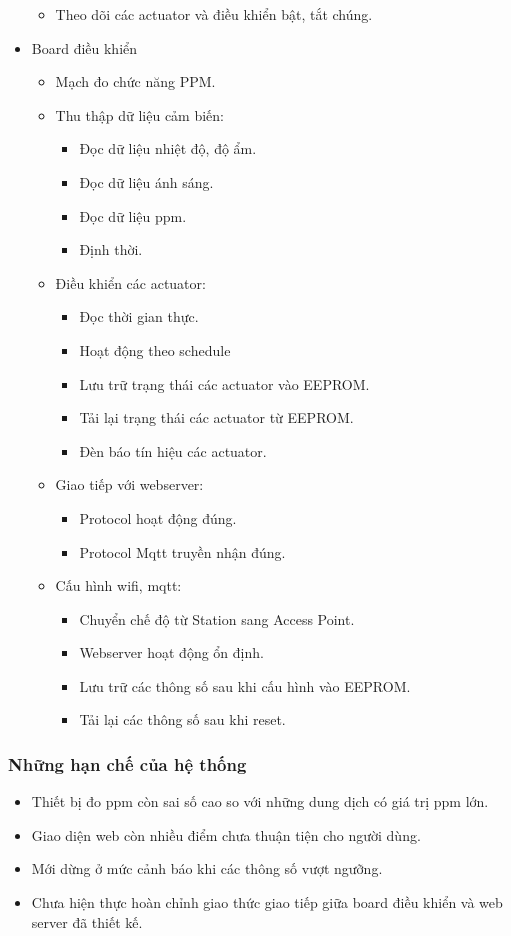 \documentclass[a4paper,12pt,oneside]{article}
\begin{document}
\begin{itemize}
\begin{itemize}
			\item Theo dõi các actuator và điều khiển bật, tắt chúng. 
		\end{itemize}
	\item Board điều khiển
	\begin{itemize}
	\item Mạch đo chức năng PPM.
	\item Thu thập dữ liệu cảm biến:
	\begin{itemize}
	\item Đọc dữ liệu nhiệt độ, độ ẩm.
	\item Đọc dữ liệu ánh sáng.
	\item Đọc dữ liệu ppm.
	\item Định thời.
	\end{itemize}
	\item Điều khiển các actuator:
	\begin{itemize}
	\item Đọc thời gian thực.
	\item Hoạt động theo schedule
	\item Lưu trữ trạng thái các actuator vào EEPROM.
	\item Tải lại trạng thái các actuator từ EEPROM.
	\item Đèn báo tín hiệu các actuator.
	\end{itemize}
	\item Giao tiếp với webserver:
	\begin{itemize}
	\item Protocol hoạt động đúng.
	\item Protocol Mqtt truyền nhận đúng.
	\end{itemize}
	\item Cấu hình wifi, mqtt:
	\begin{itemize}
	\item Chuyển chế độ từ Station sang Access Point.
	\item Webserver hoạt động ổn định.
	\item Lưu trữ các thông số sau khi cấu hình vào EEPROM.
	\item Tải lại các thông số sau khi reset.
	\end{itemize}
	\end{itemize}
	\end{itemize}
	
	\subsubsection{Những hạn chế của hệ thống}
	\begin{itemize}
	\item Thiết bị đo ppm còn sai số cao so với những dung dịch có giá trị ppm lớn.
	\item Giao diện web còn nhiều điểm chưa thuận tiện cho người dùng.
	\item Mới dừng ở mức cảnh báo khi các thông số vượt ngưỡng.
	\item Chưa hiện thực hoàn chỉnh giao thức giao tiếp giữa board điều khiển và web server đã thiết kế.
	\end{itemize}		
	
\end{document}
